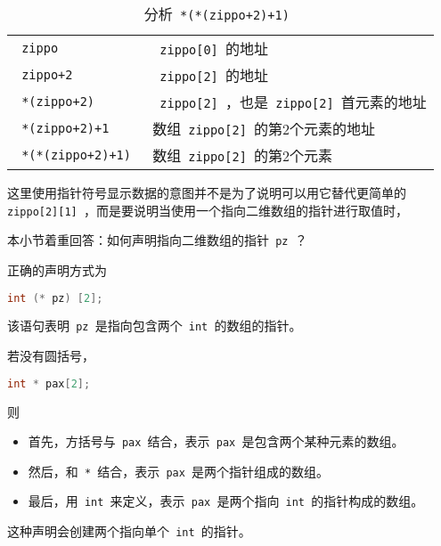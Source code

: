 \begin{frame}[fragile]\ft{\secname}
\begin{table}
\centering
\caption{分析\lstinline| *(*(zippo+2)+1) |}
\begin{tabular}{p{3.5cm}|p{6cm}}\hline
\lstinline| zippo | & \lstinline| zippo[0] |的地址\\[0.05in]
\lstinline| zippo+2 | & \lstinline| zippo[2] |的地址\\[0.05in]
\lstinline| *(zippo+2) | & \lstinline| zippo[2] |，也是\lstinline| zippo[2] |首元素的地址\\[0.05in]
\lstinline| *(zippo+2)+1 | & 数组\lstinline| zippo[2] |的第2个元素的地址\\[0.05in]
\lstinline| *(*(zippo+2)+1) | & 数组\lstinline| zippo[2] |的第2个元素\\\hline
\end{tabular}
\end{table}
\end{frame}

\begin{frame}[fragile]\ft{\secname}

这里使用指针符号显示数据的意图并不是为了说明可以用它替代更简单的\lstinline| zippo[2][1] |，而是要说明当使用一个指向二维数组的指针进行取值时，
\end{frame}

\begin{frame}[fragile]
本小节着重回答：如何声明指向二维数组的指针\lstinline| pz |？
\end{frame}

\begin{frame}[fragile]
正确的声明方式为
\begin{lstlisting}[language=c,backgroundcolor=\color{red!20}]
int (* pz) [2]; 
\end{lstlisting}
该语句表明\lstinline| pz |是指向包含两个\lstinline| int |的数组的指针。

\end{frame}

\begin{frame}[fragile]
若没有圆括号，
\begin{lstlisting}[language=c,backgroundcolor=\color{red!20}]
int * pax[2]; 
\end{lstlisting}
则
\begin{itemize}
\item
首先，方括号与\lstinline| pax |结合，表示\lstinline| pax |是包含两个某种元素的数组。
\item
然后，和\lstinline| * |结合，表示\lstinline| pax |是两个指针组成的数组。
\item
最后，用\lstinline| int |来定义，表示\lstinline| pax |是两个指向\lstinline| int |的指针构成的数组。
\end{itemize}
这种声明会创建两个指向单个\lstinline| int |的指针。
\end{frame}

